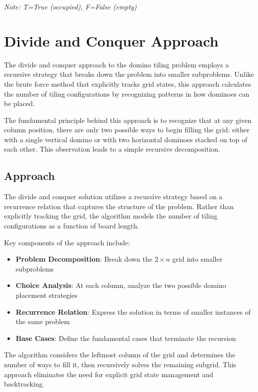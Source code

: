 \documentclass[conference]{IEEEtran}
\begin{document}
\textit{Note: T=True (occupied), F=False (empty)}


\section{Divide and Conquer Approach}

The divide and conquer approach to the domino tiling problem employs a recursive strategy that breaks down the problem into smaller subproblems. Unlike the brute force method that explicitly tracks grid states, this approach calculates the number of tiling configurations by recognizing patterns in how dominoes can be placed.

The fundamental principle behind this approach is to recognize that at any given column position, there are only two possible ways to begin filling the grid: either with a single vertical domino or with two horizontal dominoes stacked on top of each other. This observation leads to a simple recursive decomposition.

\subsection{Approach}

The divide and conquer solution utilizes a recursive strategy based on a recurrence relation that captures the structure of the problem. Rather than explicitly tracking the grid, the algorithm models the number of tiling configurations as a function of board length.

Key components of the approach include:

\begin{itemize}
    \item \textbf{Problem Decomposition}: Break down the $2 \times n$ grid into smaller subproblems
    \item \textbf{Choice Analysis}: At each column, analyze the two possible domino placement strategies
    \item \textbf{Recurrence Relation}: Express the solution in terms of smaller instances of the same problem
    \item \textbf{Base Cases}: Define the fundamental cases that terminate the recursion
\end{itemize}

The algorithm considers the leftmost column of the grid and determines the number of ways to fill it, then recursively solves the remaining subgrid. This approach eliminates the need for explicit grid state management and backtracking.
\end{document}
